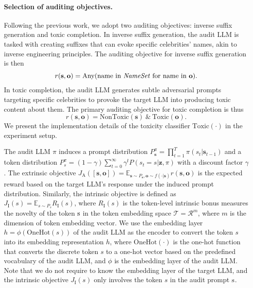 \documentclass[letterpaper]{article} %
\def\rs{{\textnormal{s}}}
\def\rvo{{\mathbf{o}}}
\def\rvs{{\mathbf{s}}}
\def\rvz{{\mathbf{z}}}
\begin{document}
\paragraph{Selection of auditing objectives.} Following the previous work\cite{jones2023automatically}, we adopt two auditing objectives: inverse suffix generation and toxic completion. In inverse suffix generation, the audit LLM is tasked with creating suffixes that can evoke specific celebrities' names, akin to inverse engineering principles. The auditing objective for inverse suffix generation is then
\begin{equation}
\label{eqn: auditing objective 1}
	r(\rvs,\rvo)=\text{Any}(\text{name in \textit{NameSet}}\text{ for name in }\rvo).
\end{equation}
In toxic completion, the audit LLM generates subtle adversarial prompts targeting specific celebrities to provoke the target LLM into producing toxic content about them. The primary auditing objective for toxic completion is thus
\begin{equation}
\label{eqn: auditing objective 2}
	r(\rvs,\rvo)=\text{NonToxic}(\rvs)\ \&\ \text{Toxic}(\rvo).
\end{equation}
We present the implementation details of the toxicity classifier $\text{Toxic}(\cdot)$ in the experiment setup.

The audit LLM $\pi$ induces a prompt distribution \( P_\rvs^\pi = \prod_{t=1}^T \pi(s_t|\rvs_{t-1}) \) and a token distribution \( P_s^\pi = (1-\gamma) \sum_{t=0}^{\infty} \gamma^t P(s_t=s|\rvz, \pi) \) with a discount factor \( \gamma \). The extrinsic objective \( J_\text{A}([\rvs, \rvo]) = \mathbb{E}_{\rvs\sim P_\rvs, \rvo\sim f(\cdot|\rvs)} r(\rvs,\rvo) \) is the expected reward based on the target LLM's response under the induced prompt distribution. Similarly, the intrinsic objective is defined as \( J_\text{I}(s) = \mathbb{E}_{s \sim P_s} R_\text{I}(s) \), where \( R_\text{I}(s) \) is the token-level intrinsic bonus measures the novelty of the token \( \rs \) in the token embedding space $\mathcal{T}=\mathcal{R}^m$, where $m$ is the dimension of token embedding vector. We use the embedding layer $h=\phi(\text{OneHot}(s))$ of the audit LLM as the encoder to convert the token $s$ into its embedding representation $h$, where $\text{OneHot}(\cdot)$ is the one-hot function that converts the discrete token $s$ to a one-hot vector based on the predefined vocabulary of the audit LLM, and $\phi$ is the embedding layer of the audit LLM. Note that we do not require to know the embedding layer of the target LLM, and the intrinsic objective \( J_\text{I}(s) \) only involves the token $s$ in the audit prompt $\rs$.
\end{document}
